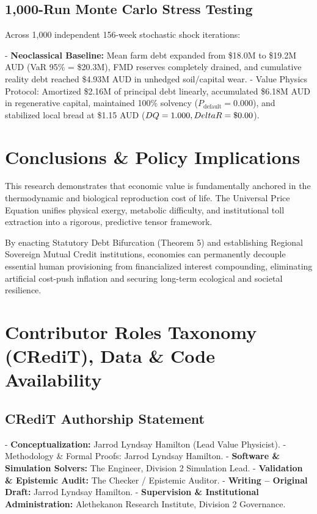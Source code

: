 \documentclass[preprint,12pt,authoryear]{elsarticle}
\theoremstyle{definition}
\begin{document}
\subsection{1,000-Run Monte Carlo Stress Testing}

Across 1,000 independent 156-week stochastic shock iterations:

  

  - \textbf{Neoclassical Baseline:} Mean farm debt expanded from \$18.0M to \$19.2M AUD (VaR 95\% = \$20.3M), FMD reserves completely drained, and cumulative reality debt reached \$4.93M AUD in unhedged soil/capital wear.
  - Value Physics Protocol: Amortized \$2.16M of principal debt linearly, accumulated \$6.18M AUD in regenerative capital, maintained 100\% solvency ($P_{\text{default}} = 0.000$), and stabilized local bread at \$1.15 AUD ($DQ = 1.000, \\Delta R = \$0.00$).

\section{Conclusions \& Policy Implications}

This research demonstrates that economic value is fundamentally anchored in the thermodynamic and biological reproduction cost of life. The Universal Price Equation unifies physical exergy, metabolic difficulty, and institutional toll extraction into a rigorous, predictive tensor framework.

  

By enacting Statutory Debt Bifurcation (Theorem 5) and establishing Regional Sovereign Mutual Credit institutions, economies can permanently decouple essential human provisioning from financialized interest compounding, eliminating artificial cost-push inflation and securing long-term ecological and societal resilience.

\section{Contributor Roles Taxonomy (CRediT), Data \& Code Availability}

\subsection{CRediT Authorship Statement}

  - \textbf{Conceptualization:} Jarrod Lyndsay Hamilton (Lead Value Physicist).
  - Methodology \& Formal Proofs: Jarrod Lyndsay Hamilton.
  - \textbf{Software \& Simulation Solvers:} The Engineer, Division 2 Simulation Lead.
  - \textbf{Validation \& Epistemic Audit:} The Checker / Epistemic Auditor.
  - \textbf{Writing – Original Draft:} Jarrod Lyndsay Hamilton.
  - \textbf{Supervision \& Institutional Administration:} Alethekanon Research Institute, Division 2 Governance.
\end{document}
